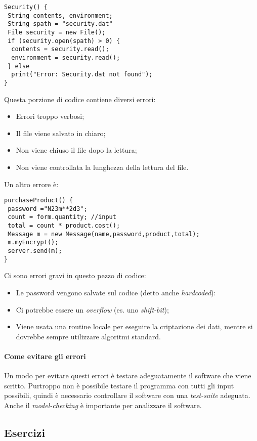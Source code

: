 \begin{verbatim}
Security() {
 String contents, environment;
 String spath = "security.dat"
 File security = new File();
 if (security.open(spath) > 0) {
  contents = security.read();
  environment = security.read();
 } else
  print("Error: Security.dat not found");
}
\end{verbatim}

Questa porzione di codice contiene diversi errori:
\begin{itemize}
\item Errori troppo verbosi;
\item Il file viene salvato in chiaro;
\item Non viene chiuso il file dopo la lettura;
\item Non viene controllata la lunghezza della lettura del file.
\end{itemize}

Un altro errore è:
\begin{verbatim}
purchaseProduct() {
 password ="N23m**2d3";
 count = form.quantity; //input
 total = count * product.cost();
 Message m = new Message(name,password,product,total);
 m.myEncrypt();
 server.send(m);
}
\end{verbatim}

Ci sono errori gravi in questo pezzo di codice:
\begin{itemize}
\item Le password vengono salvate sul codice (detto anche \textit{hardcoded}):
\item Ci potrebbe essere un \textit{overflow} (es. uno \textit{shift-bit});
\item Viene usata una routine locale per eseguire la criptazione dei dati, 
mentre si dovrebbe sempre utilizzare algoritmi standard.
\end{itemize}


\paragraph*{Come evitare gli errori} Un modo per evitare questi errori è 
testare adeguatamente il software che viene scritto. Purtroppo non è possibile 
testare il programma con tutti gli input possibili, quindi è necessario 
controllare il software con una \textit{test-suite} adeguata. 
Anche il \textit{model-checking} è importante per analizzare il software.

\subsection{Esercizi}

